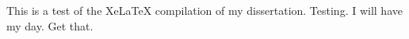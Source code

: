 \documentclass{memoir}
\begin{document}
This is a test of the XeLaTeX compilation of my
dissertation. Testing. I will have my day. Get that.
\end{document}
